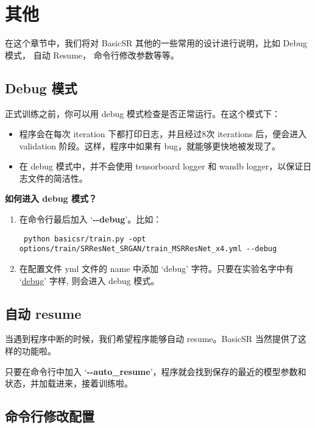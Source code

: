 \documentclass[../main.tex]{subfiles}
\begin{document}
\chapter{其他}
\vspace{-2cm}

在这个章节中，我们将对 BasicSR 其他的一些常用的设计进行说明，比如 Debug 模式， 自动 Resume， 命令行修改参数等等。 

\section{Debug 模式}\label{sec:debug_mode}

正式训练之前，你可以用 debug 模式检查是否正常运行。在这个模式下：
\begin{itemize}
	\item 程序会在每次 iteration 下都打印日志，并且经过8次 iterations 后，便会进入 validation 阶段。这样，程序中如果有 bug，就能够更快地被发现了。
	\item 在 debug 模式中，并不会使用 tensorboard logger 和 wandb logger，以保证日志文件的简洁性。
\end{itemize}

\textbf{如何进入 debug 模式？}

\begin{enumerate}[方式 1.]
	\item 在命令行最后加入 ‘\textbf{-{}-debug}’。比如：
	\begin{verbatim}
 python basicsr/train.py -opt options/train/SRResNet_SRGAN/train_MSRResNet_x4.yml --debug
	\end{verbatim}
	\item 在配置文件 yml 文件的 name 中添加 ‘debug’ 字符。只要在实验名字中有 ‘\uline{debug}’ 字样, 则会进入 debug 模式。
\end{enumerate}

\section{自动 resume}

当遇到程序中断的时候，我们希望程序能够自动 resume。BasicSR 当然提供了这样的功能啦。

只要在命令行中加入 ‘\textbf{-{}-auto\_resume}’，程序就会找到保存的最近的模型参数和状态，并加载进来，接着训练啦。

\section{命令行修改配置}
\end{document}
